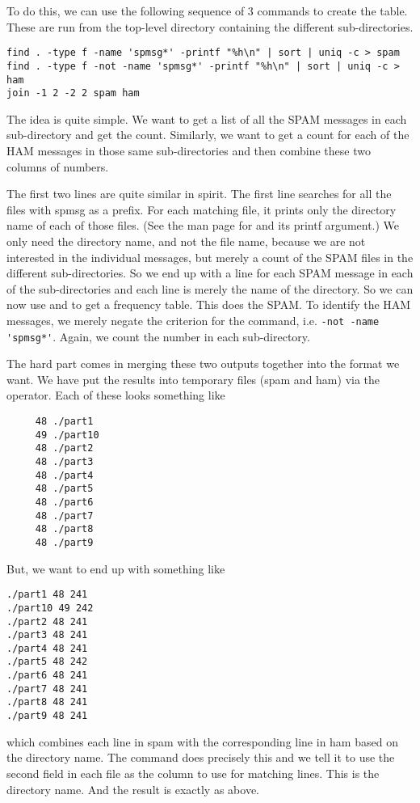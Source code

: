 \begin{comment}
\begin{verbatim}
for i in part* ; do cd $i; echo "$i `ls -1 spmsg* | wc -l`  `find . -not -name 'spmsg*' | wc -l`" ; cd .. ; done
\end{verbatim}
\end{comment}





To do this, we can use the following sequence of 3 commands
to create the table.
These are run from the top-level directory containing the
different  sub-directories.
\begin{verbatim}
find . -type f -name 'spmsg*' -printf "%h\n" | sort | uniq -c > spam
find . -type f -not -name 'spmsg*' -printf "%h\n" | sort | uniq -c > ham
join -1 2 -2 2 spam ham
\end{verbatim}
The idea is quite simple. We want to get a list of
all the SPAM messages in each sub-directory
and get the count.
Similarly, we want to get a count for each of the HAM
messages in those same sub-directories and then
combine these two columns of numbers.

The first two lines are quite similar in spirit.
The first line searches for all the files with  spmsg
as a prefix.  For each matching file, it prints only the directory name
of each of those files. (See the man page for  and its
printf argument.)
We only need the directory name, and not the file name,
because we are not interested in the individual
messages, but merely a count of the SPAM files in the different
sub-directories. So we end up with a line for each SPAM message in
each of the sub-directories and each line is merely the name of the
directory. So we can now use  and 
to get a frequency table.
This does the SPAM. To identify the HAM messages, we merely negate the
criterion for the  command, i.e. \verb+-not -name 'spmsg*'+.
Again, we count the number in each sub-directory.

The hard part comes in merging these two outputs together into
the format we want.  We have put the results into temporary
files (spam and ham) via the $\>$ operator.
Each of these looks something like
\begin{verbatim}
     48 ./part1
     49 ./part10
     48 ./part2
     48 ./part3
     48 ./part4
     48 ./part5
     48 ./part6
     48 ./part7
     48 ./part8
     48 ./part9
\end{verbatim}
But, we want to end up with something like
\begin{verbatim}
./part1 48 241
./part10 49 242
./part2 48 241
./part3 48 241
./part4 48 241
./part5 48 242
./part6 48 241
./part7 48 241
./part8 48 241
./part9 48 241
\end{verbatim}
which combines each line in spam with the corresponding line in ham
based on the directory name. 
The  command does precisely this 
and we tell it to use the second field in each file
as the column to use for matching lines. This is the
directory name.  And the result is exactly as above.





